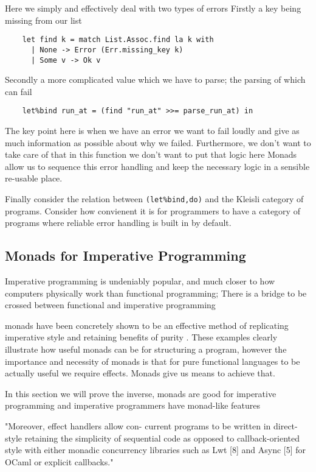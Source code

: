 Here we simply and effectively deal with two types of errors
Firstly a key being missing from our list
\begin{verbatim}
    let find k = match List.Assoc.find la k with
      | None -> Error (Err.missing_key k)
      | Some v -> Ok v
\end{verbatim}
Secondly a more complicated value which we have to parse;
the parsing of which can fail
\begin{verbatim}
    let%bind run_at = (find "run_at" >>= parse_run_at) in
\end{verbatim}
The key point here is when we have an error we want to fail
loudly and give as much information as possible about why we failed.
Furthermore, we don't want to take care of that in this function
we don't want to put that logic here
Monads allow us to sequence this error handling
and keep the necessary logic in a sensible re-usable place.

Finally consider the relation between
\texttt{(let\%bind,do)} and the Kleisli category of programs.
Consider how convienent it is for programmers to have a category
of programs where reliable error handling is built in by default.

\subsection{Monads for Imperative Programming}
Imperative programming is undeniably popular,
and much closer to how computers physically work than functional programming;
There is a bridge to be crossed between functional and imperative programming

monads have been concretely shown to be an effective method of replicating
imperative style and retaining benefits of purity \cite{PeytonJones:1993}.
These examples clearly illustrate how useful monads can be for structuring a program,
however the importance and necessity of monads is that for pure functional languages
to be actually useful we require effects. Monads give us means to achieve that.

In this section we will prove the inverse,
monads are good for imperative programming
and imperative programmers have monad-like features



"Moreover, effect handlers allow con- current programs to be written in direct-style retaining the simplicity of sequential code as opposed to callback-oriented style with either monadic concurrency libraries such as Lwt [8] and Async [5] for OCaml or explicit callbacks."
\cite{dolaneffectively}

